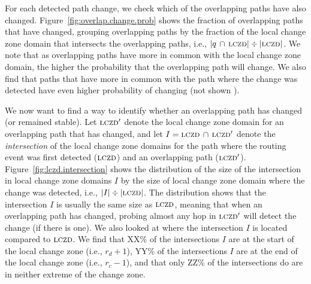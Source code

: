 For each detected path change, we check which of the overlapping
paths have also changed.  Figure~\ref{fig:overlap.change.prob} shows
the fraction of overlapping paths that have changed, grouping
overlapping paths by the fraction of the local change zone domain
that intersects the overlapping paths, i.e.,
$|q\,\cap\,\mathrm{\textsc{lczd}}|\div|\mathrm{\textsc{lczd}}|$.  We note that as overlapping paths
have more in common with the local change zone domain, the higher
the probability that the overlapping path will change.  We also find
that paths that have more in common with the path where the change
was detected have even higher probability of changing (not shown
).

We now want to find a way to identify whether an overlapping path
has changed (or remained stable).  Let $\mathrm{\textsc{lczd}}'$ denote the local
change zone domain for an overlapping path that has changed, and let
$I = \mathrm{\textsc{lczd}}\,\cap\,\mathrm{\textsc{lczd}}'$ denote the \emph{intersection} of the
local change zone domains for the path where the routing event was
first detected ($\mathrm{\textsc{lczd}}$) and an overlapping path ($\mathrm{\textsc{lczd}}'$).
Figure~\ref{fig:lczd.intersection} shows the distribution of the
size of the intersection in local change zone domains $I$ by the
size of local change zone domain where the change was detected,
i.e., $|I|\div|\mathrm{\textsc{lczd}}|$.  The distribution shows that the
intersection $I$ is usually the same size as $\mathrm{\textsc{lczd}}$, meaning that
when an overlapping path has changed, probing almost any hop in
$\mathrm{\textsc{lczd}}'$ will detect the change (if there is one).  We also looked
at where the intersection $I$ is located compared to $\mathrm{\textsc{lczd}}$.  We
find that XX\% of the intersections $I$ are at the start of the
local change zone (i.e., $r_d + 1$), YY\% of the intersections $I$
are at the end of the local change zone (i.e., $r_c - 1$), and that
only ZZ\% of the intersections do are in neither extreme of the
change zone.

